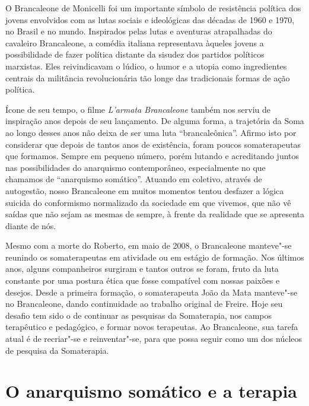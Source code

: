 O Brancaleone de Monicelli foi um importante símbolo de resistência
política dos jovens envolvidos com as lutas sociais e ideológicas das
décadas de 1960 e 1970, no Brasil e no mundo. Inspirados pelas lutas e
aventuras atrapalhadas do cavaleiro Brancaleone, a comédia italiana
representava àqueles jovens a possibilidade de fazer política
distante da sisudez dos partidos políticos marxistas. Eles reivindicavam
o lúdico, o humor e a utopia como ingredientes centrais da militância
revolucionária tão longe das tradicionais formas de ação política.

Ícone de seu tempo, o filme \emph{L'armata Brancaleone} também nos
serviu de inspiração anos depois de seu lançamento. De alguma forma, a
trajetória da Soma ao longo desses anos não deixa de ser uma luta
``brancaleônica''. Afirmo isto por considerar que depois de tantos anos
de existência, foram poucos somaterapeutas que formamos. Sempre em
pequeno número, porém lutando e acreditando juntos nas possibilidades do
anarquismo contemporâneo, especialmente no que chamamos de ``anarquismo
somático''. Atuando em coletivo, através de autogestão, nosso
Brancaleone em muitos momentos tentou desfazer a lógica suicida do
conformismo normalizado da sociedade em que vivemos, que não vê saídas
que não sejam as mesmas de sempre, à frente da realidade que se apresenta
diante de nós.

Mesmo com a morte do Roberto, em maio de 2008, o Brancaleone manteve"-se
reunindo os somaterapeutas em atividade ou em estágio de formação. Nos
últimos anos, alguns companheiros surgiram e tantos outros se foram,
fruto da luta constante por uma postura ética que fosse compatível com
nossas paixões e desejos. Desde a primeira formação, o somaterapeuta
João da Mata manteve"-se no Brancaleone, dando continuidade ao trabalho %
original de Freire. Hoje seu desafio tem sido o de continuar as
pesquisas da Somaterapia, nos campos terapêutico e pedagógico, e formar
novos terapeutas. Ao Brancaleone, sua tarefa atual é de recriar"-se e
reinventar"-se, para que possa seguir como um dos núcleos de pesquisa da
Somaterapia.

\section{O anarquismo somático e a terapia}

